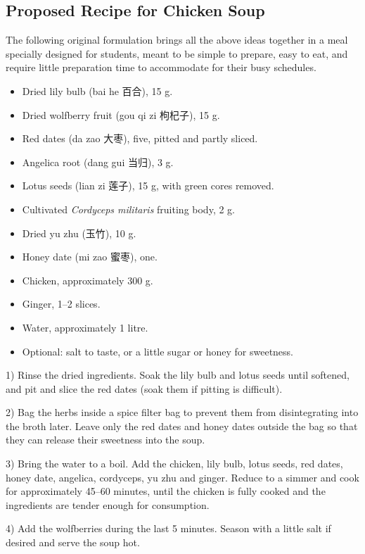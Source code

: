 \documentclass[12pt,a4paper]{article}
\begin{document}
\subsection{Proposed Recipe for Chicken Soup}
The following original formulation brings all the above ideas together in a meal specially designed for students, meant to be simple to prepare, easy to eat, and require little preparation time to accommodate for their busy schedules.

\begin{itemize}
\item Dried lily bulb (bai he 百合), 15 g.
\item Dried wolfberry fruit (gou qi zi 枸杞子), 15 g.
\item Red dates (da zao 大枣), five, pitted and partly sliced.
\item Angelica root (dang gui 当归), 3 g.
\item Lotus seeds (lian zi 莲子), 15 g, with green cores removed.
\item Cultivated \emph{Cordyceps militaris} fruiting body, 2 g.
\item Dried yu zhu (玉竹), 10 g.
\item Honey date (mi zao 蜜枣), one.
\item Chicken, approximately 300 g.
\item Ginger, 1--2 slices.
\item Water, approximately 1 litre.
\item Optional: salt to taste, or a little sugar or honey for sweetness.
\end{itemize}

1) Rinse the dried ingredients. Soak the lily bulb and lotus seeds until softened, and pit and slice the red dates (soak them if pitting is difficult).

2) Bag the herbs inside a spice filter bag to prevent them from disintegrating into the broth later. Leave only the red dates and honey dates outside the bag so that they can release their sweetness into the soup.

3) Bring the water to a boil. Add the chicken, lily bulb, lotus seeds, red dates, honey date, angelica, cordyceps, yu zhu and ginger. Reduce to a simmer and cook for approximately 45--60 minutes, until the chicken is fully cooked and the ingredients are tender enough for consumption.

4) Add the wolfberries during the last 5 minutes. Season with a little salt if desired and serve the soup hot.
\end{document}
